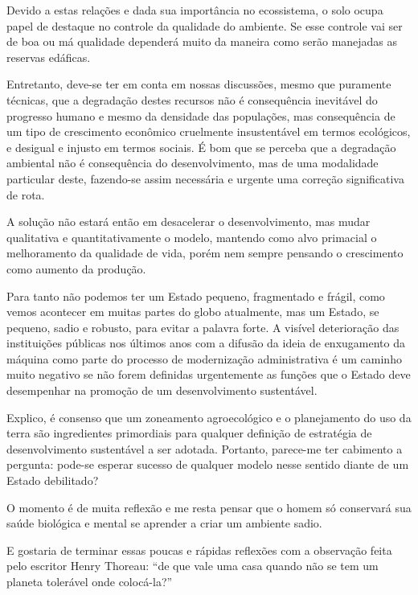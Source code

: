 Devido a estas relações e dada sua importância no ecossistema, o solo ocupa papel de destaque no controle da qualidade do ambiente. Se esse controle vai ser de boa ou má qualidade dependerá muito da maneira como serão manejadas as reservas edáficas.

Entretanto, deve-se ter em conta em nossas discussões, mesmo que puramente técnicas, que a degradação destes recursos não é consequência inevitável do progresso humano e mesmo da densidade das populações, mas consequência de um tipo de crescimento econômico cruelmente insustentável em termos ecológicos, e desigual e injusto em termos sociais. É bom que se perceba que a degradação ambiental não é consequência do desenvolvimento, mas de uma modalidade particular deste, fazendo-se assim necessária e urgente uma correção significativa de rota.

A solução não estará então em desacelerar o desenvolvimento, mas mudar qualitativa e quantitativamente o modelo, mantendo como alvo primacial o melhoramento da qualidade de vida, porém nem sempre pensando o crescimento como aumento da produção.

Para tanto não podemos ter um Estado pequeno, fragmentado e frágil, como vemos acontecer em muitas partes do globo atualmente, mas um Estado, se pequeno, sadio e robusto, para evitar a palavra forte. A visível deterioração das instituições  públicas nos últimos anos com a difusão da ideia de enxugamento da máquina como parte do processo de modernização administrativa é um caminho muito negativo se não forem definidas urgentemente as funções que o Estado deve desempenhar na promoção de um desenvolvimento sustentável.

Explico, é consenso que um zoneamento agroecológico e o planejamento do uso da terra são ingredientes primordiais para qualquer definição de estratégia de desenvolvimento sustentável a ser adotada. Portanto, parece-me ter cabimento a pergunta: pode-se esperar sucesso de qualquer modelo nesse sentido diante de um Estado debilitado?

O momento é de muita reflexão e me resta pensar que o homem só conservará sua saúde biológica e mental se aprender a criar um ambiente sadio.

E gostaria de terminar essas poucas e rápidas reflexões com a observação feita pelo escritor Henry Thoreau: ``de que vale uma casa quando não se tem um planeta tolerável onde colocá-la?''

\address{Otávio Antonio de Camargo\\
  Instituto Agronômico de Campinas, IAC\\
  \url{http://lattes.cnpq.br/1337171805613486}\\
  }
